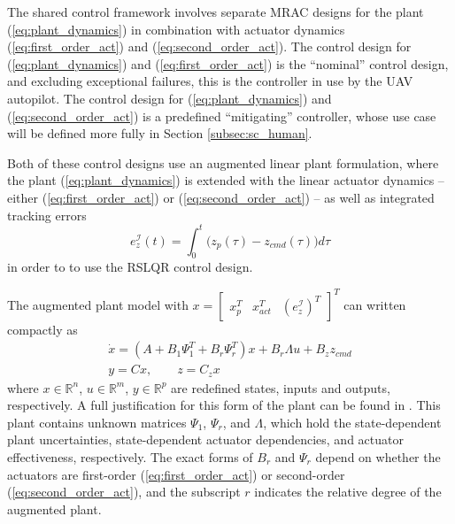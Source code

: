 \documentclass[english]{ifacconf}
\begin{document}
The shared control framework involves separate MRAC designs for the plant (\ref{eq:plant_dynamics}) in combination with actuator dynamics (\ref{eq:first_order_act}) and (\ref{eq:second_order_act}). The control design for (\ref{eq:plant_dynamics}) and (\ref{eq:first_order_act}) is the ``nominal'' control design, and excluding exceptional failures, this is the controller in use by the UAV autopilot. The control design for (\ref{eq:plant_dynamics}) and (\ref{eq:second_order_act}) is a predefined ``mitigating'' controller, whose use case will be defined more fully in Section \ref{subsec:sc_human}.

Both of these control designs use an augmented linear plant formulation, where the plant (\ref{eq:plant_dynamics}) is extended with the linear actuator dynamics -- either (\ref{eq:first_order_act}) or (\ref{eq:second_order_act}) -- as well as integrated tracking errors 
\begin{equation}
	e_z^{\mathcal{I}}(t) = \int_0^{t} \big( z_p(\tau) - z_{cmd}(\tau)\big) d\tau
\end{equation}
in order to to use the RSLQR control design.

The augmented plant model with $x = \begin{bmatrix} x_p^T & x_{act}^T & (e_z^{\mathcal{I}})^T\end{bmatrix}^T$ can written compactly as
\begin{equation}
\begin{array}{c}
\dot{x}= \left(A+B_{1}\Psi_{1}^{T}+B_{r}\Psi_{r}^{T}\right) x+B_{r}\Lambda u+B_{z}z_{cmd}\\
y=Cx,\qquad z=C_{z}x
\end{array} \label{eq:augmented_plant}
\end{equation}
where $x\in\mathbb{R}^{n}$, $u\in\mathbb{R}^{m}$, $y\in\mathbb{R}^{p}$ are redefined states, inputs and outputs, respectively. A full justification for this form of the plant can be found in \cite{qu2016phd, qu2016adaptive}. This plant contains unknown matrices $\Psi_1$, $\Psi_r$, and $\Lambda$, which hold the state-dependent plant uncertainties, state-dependent actuator dependencies, and actuator effectiveness, respectively. The exact forms of $B_r$ and $\Psi_r$ depend on whether the actuators are first-order (\ref{eq:first_order_act}) or second-order (\ref{eq:second_order_act}), and the subscript $r$ indicates the relative degree of the augmented plant.
\end{document}
